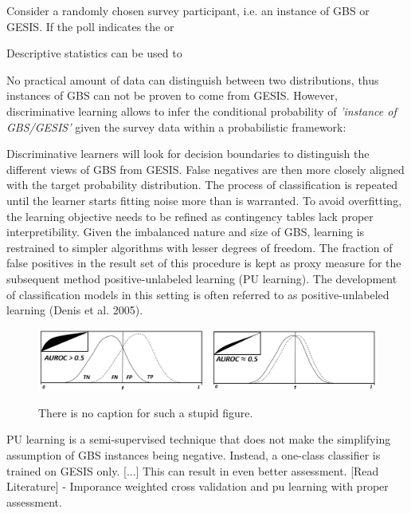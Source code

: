 Consider a randomly chosen survey participant, i.e. an instance of GBS or GESIS. If the poll indicates the or

Descriptive statistics can be used to 
 
No practical amount of data can distinguish between two distributions, thus instances of GBS can not be proven to come from GESIS. However, discriminative learning allows to infer the conditional probability of \textit{'instance of GBS/GESIS'} given the survey data within a probabilistic framework:

Discriminative learners will look for decision boundaries to distinguish the different views of GBS from GESIS. False negatives are then more closely aligned with the target probability distribution. The process of classification is repeated until the learner starts fitting noise more than is warranted. To avoid overfitting, the learning objective needs to be refined as contingency tables lack proper interpretibility. Given the imbalanced nature and size of GBS, learning is restrained to simpler algorithms with lesser degrees of freedom. The fraction of false positives in the result set of this procedure is kept as proxy measure for the subsequent method positive-unlabeled learning (PU learning). The development of classiﬁcation models in this setting is often referred to as positive-unlabeled learning (Denis et al. 2005).

\begin{figure}[ht]
	\begin{center}
		\includegraphics[scale=0.53,angle=0]{fig/roc_example}
		\label{project}
		\caption{There is no caption for such a stupid figure.}
	\end{center}
\end{figure}

PU learning is a semi-supervised technique that does not make the simplifying assumption of GBS instances being negative. Instead, a one-class classifier is trained on GESIS only. [...] This can result in even better assessment. [Read Literature] - Imporance weighted cross validation and pu learning with proper assessment.
